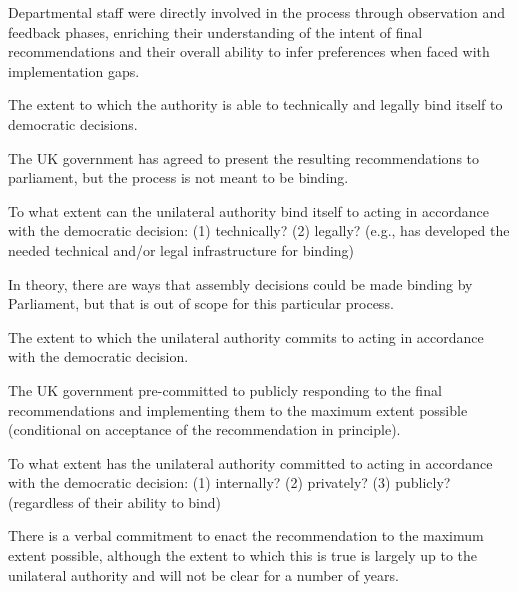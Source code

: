     Departmental staff were directly involved in the process through observation and feedback phases, enriching their understanding of the intent of final recommendations and their overall ability to infer preferences when faced with implementation gaps.

    
    \begin{describe}[grey]
        The extent to which the authority is able to technically and legally bind itself to democratic decisions.
    \end{describe}

    The UK government has agreed to present the resulting recommendations to parliament, but the process is not meant to be binding. 
    
    \begin{evaluate}[grey]
        To what extent can the unilateral authority bind itself to acting in accordance with the democratic decision: (1) technically? (2) legally? (e.g., has developed the needed technical and/or legal infrastructure for binding)
    \end{evaluate}

    In theory, there are ways that assembly decisions could be made binding by Parliament, but that is out of scope for this particular process.
    
    
    
    
    \begin{describe}[grey]
        The extent to which the unilateral authority commits to acting in accordance with the democratic decision.
    \end{describe}

    The UK government pre-committed to publicly responding to the final recommendations and implementing them to the maximum extent possible (conditional on acceptance of the recommendation in principle).
    
    \begin{evaluate}[grey]
        To what extent has the unilateral authority committed to acting in accordance with the democratic decision: (1) internally? (2) privately? (3) publicly?  (regardless of their ability to bind)
    \end{evaluate}

    There is a verbal commitment to enact the recommendation to the maximum extent possible, although the extent to which this is true is largely up to the unilateral authority and will not be clear for a number of years.
    
